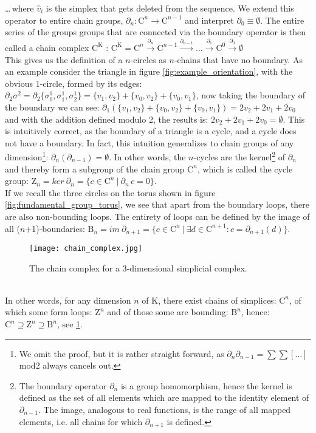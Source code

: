 \dots \,where $\hat{v}_{i}$ is the simplex that gets deleted from the sequence.
We extend this operator to entire chain groups, $\partial_{n}: \mathrm{C}^{n} \rightarrow \mathrm{C}^{n-1}$ and interpret $\partial_{0} \equiv \emptyset$.
The entire series of the groups groups that are connected via the boundary operator is then called a chain complex $\mathrm{C}^{\mathrm{K}}$ : $\mathrm{C}^{\mathrm{K}} = \mathrm{C}^{n} \overset{\partial_{n}}{\longrightarrow} \mathrm{C}^{n-1} \overset{\partial_{n-1}}{\longrightarrow} \dots \overset{\partial_{1}}{\longrightarrow} \mathrm{C}^{0} \overset{\partial_{0}}{\longrightarrow} \emptyset$\\
This gives us the definition of a $n$-circles as $n$-chains that have no boundary.
As an example consider the triangle in figure \ref{fig:example_orientation}, with the obvious $1$-circle, formed by its edges: $\partial_{2} \sigma^{2} = \partial_{2} \{ \sigma^{1}_{0}, \sigma^{1}_{1}, \sigma^{1}_{2} \} = \{v_{1}, v_{2}\} + \{v_{0}, v_{2}\} + \{v_{0}, v_{1}\}$, now taking the boundary of the boundary we can see: $\partial_{1} (\{v_{1}, v_{2}\} + \{v_{0}, v_{2}\} + \{v_{0}, v_{1}\}) = 2v_{2}+2v_{1}+2v_{0}$ and with the addition defined modulo 2, the results is: $2v_{2}+2v_{1}+2v_{0} = \emptyset$.
This is intuitively correct, as the boundary of a triangle is a cycle, and a cycle does not have a boundary.
In fact, this intuition generalizes to chain groups of any dimension\footnote{ We omit the proof, but it is rather straight forward, as $\partial_{n} \partial_{n-1} = \sum \sum [\dots]$ mod2 always cancels out.}: $\partial_{n}(\partial_{n-1}) = \emptyset$.
In other words, the $n$-cycles are the kernel\footnote{ The boundary operator $\partial_{n}$ is a group homomorphism, hence the kernel is defined as the set of all elements which are mapped to the identity element of $\partial_{n-1}$. The image, analogous to real functions, is the range of all mapped elements, i.e. all chains for which $\partial_{n+1}$ is defined.} of $\partial_{n}$ and thereby form a subgroup of the chain group $\mathrm{C}^{n}$, which is called the cycle group: $\mathrm{Z}_{n} = ker ~ \partial_{n} = \{ c \in \mathrm{C}^{n} ~ | ~ \partial_{n} \, c = 0\}$.\\
If we recall the three circles on the torus shown in figure \ref{fig:fundamental_group_torus}, we see that apart from the boundary loops, there are also non-bounding loops.
The entirety of loops can be defined by the image of all ($n$+1)-boundaries: $\mathrm{B}_{n} = im ~ \partial_{n+1} = \{ c \in \mathrm{C}^{n} ~|~ \exists d \in \mathrm{C}^{n+1} : c = \partial_{n+1}(d) \}$.
\begin{figure}[htb]
\centering
\texttt{[image: chain\_complex.jpg]}
\caption{The chain complex for a $3$-dimensional simplicial complex.}
\label{fig:chain_complex}
\end{figure}\\
In other words, for any dimension $n$ of $\mathrm{K}$, there exist chains of simplices: $\mathrm{C}^{n}$, of which some form loops: $\mathrm{Z}^{n}$ and of those some are bounding: $\mathrm{B}^{n}$, hence: $\mathrm{C}^{n} \supseteq \mathrm{Z}^{n} \supseteq \mathrm{B}^{n}$, see \ref{fig:chain_complex}.

